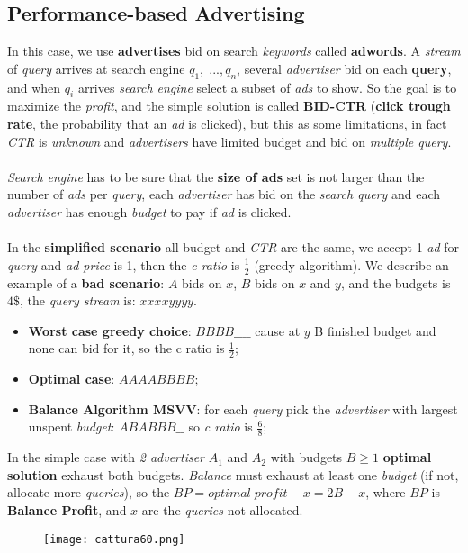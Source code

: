 \documentclass{article}
\begin{document}
\subsection{Performance-based Advertising}
In this case, we use \textbf{advertises} bid on search \emph{keywords} called \textbf{adwords}. A \emph{stream} of \emph{query} arrives at search engine $q_1, \;..., q_n$, several \emph{advertiser} bid on each \textbf{query}, and when $q_i$ arrives \emph{search engine} select a subset of \emph{ads} to show. So the goal is to maximize the \emph{profit}, and the simple solution is called \textbf{BID-CTR} (\textbf{click trough rate}, the probability that an \emph{ad} is clicked), but this as some limitations, in fact \emph{CTR} is \emph{unknown} and \emph{advertisers} have limited budget and bid on \emph{multiple query}.\\\\
\emph{Search engine} has to be sure that the \textbf{size of ads} set is not larger than the number of \emph{ads} per \emph{query}, each \emph{advertiser} has bid on the \emph{search query} and each \emph{advertiser} has enough \emph{budget} to pay if \emph{ad} is clicked. \\\\
In the \textbf{simplified scenario} all budget and \emph{CTR} are the same,  we accept 1 \emph{ad} for \emph{query} and \emph{ad price} is 1, then the \emph{c ratio} is $\frac{1}{2}$ (greedy algorithm). We describe an example of a \textbf{bad scenario}: $A$ bids on $x$, $B$ bids on $x$ and $y$, and the budgets is $4\$$, the \emph{query stream} is: $xxxxyyyy$. 
\begin{itemize}
\item \textbf{Worst case greedy choice}: $BBBB\_\_\_\_$ cause at $y$ B finished budget and none can bid for it, so the c ratio is $\frac{1}{2}$;
\item \textbf{Optimal case}: $AAAABBBB$;
\item \textbf{Balance Algorithm MSVV}: for each \emph{query} pick the \emph{advertiser} with largest unspent \emph{budget}: $ABABBB\_\_$ so \emph{c ratio} is $\frac{6}{8}$;
\end{itemize}
In the simple case with\emph{ 2 advertiser} $A_1$ and $A_2$ with budgets $B \geq 1$ \textbf{optimal solution} exhaust both budgets. \emph{Balance} must exhaust at least one \emph{budget} (if not, allocate more \emph{queries}), so the $BP = optimal\; profit - x = 2B - x$, where $BP$ is \textbf{Balance Profit}, and $x$ are the \emph{queries} not allocated.
\begin{figure}[H]
  \centering
  \texttt{[image: cattura60.png]}
\end{figure}
\end{document}
